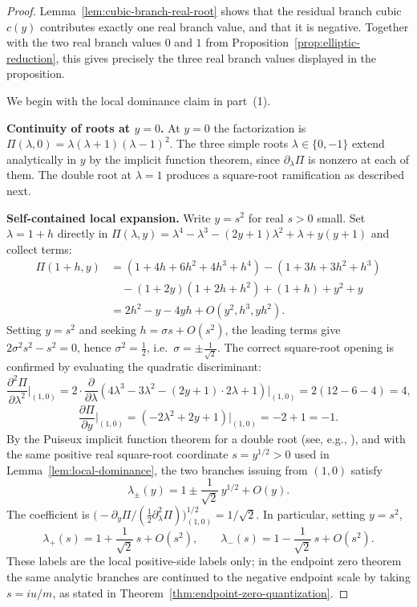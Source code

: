 \begin{proof}
Lemma~\ref{lem:cubic-branch-real-root} shows that the residual branch cubic \(c(y)\) contributes exactly one real branch value, and that it is negative.
Together with the two real branch values \(0\) and \(1\) from Proposition~\ref{prop:elliptic-reduction}, this gives precisely the three real branch values displayed in the proposition.

We begin with the local dominance claim in part~(1).

\medskip
\noindent\textbf{Continuity of roots at $y=0$.}
At $y=0$ the factorization is $\Pi(\lambda,0)=\lambda(\lambda+1)(\lambda-1)^2$.
The three simple roots $\lambda\in\{0,-1\}$ extend analytically in $y$ by the implicit function theorem, since $\partial_\lambda\Pi$ is nonzero at each of them.
The double root at $\lambda=1$ produces a square-root ramification as described next.

\medskip
\noindent\textbf{Self-contained local expansion.}
Write $y=s^2$ for real $s>0$ small.
Set $\lambda=1+h$ directly in $\Pi(\lambda,y)=\lambda^4-\lambda^3-(2y+1)\lambda^2+\lambda+y(y+1)$ and collect terms:
\begin{align*}
\Pi(1+h,y)
&= (1+4h+6h^2+4h^3+h^4) - (1+3h+3h^2+h^3)\\
&\quad - (1+2y)(1+2h+h^2) + (1+h) + y^2+y\\
&= 2h^2 - y - 4yh + O(y^2, h^3, yh^2).
\end{align*}
Setting $y=s^2$ and seeking $h=\sigma s+O(s^2)$, the leading terms give $2\sigma^2 s^2 - s^2 = 0$, hence $\sigma^2=\tfrac12$, i.e.\ $\sigma=\pm\tfrac{1}{\sqrt{2}}$.
The correct square-root opening is confirmed by evaluating the quadratic discriminant:
\[
\frac{\partial^2\Pi}{\partial\lambda^2}\bigg|_{(1,0)} = 2\cdot\frac{\partial}{\partial\lambda}(4\lambda^3-3\lambda^2-(2y+1)\cdot 2\lambda+1)\bigg|_{(1,0)}=2(12-6-4)=4,
\]
\[
\frac{\partial\Pi}{\partial y}\bigg|_{(1,0)} = (-2\lambda^2+2y+1)\bigg|_{(1,0)}=-2+1=-1.
\]
By the Puiseux implicit function theorem for a double root (see, e.g., \cite{BrieskornKnorrer1986}), and with the same positive real square-root coordinate \(s=y^{1/2}>0\) used in Lemma~\ref{lem:local-dominance}, the two branches issuing from $(1,0)$ satisfy
\begin{equation}\label{eq:local-bifurc}
\lambda_\pm(y)=1\pm\frac{1}{\sqrt{2}}\,y^{1/2}+O(y).
\end{equation}
The coefficient is
\(\bigl(-\partial_y\Pi/(\tfrac12\partial_\lambda^2\Pi)\bigr)^{1/2}_{(1,0)}=1/\sqrt2\).
In particular, setting $y=s^2$,
\begin{equation}\label{eq:lambda-pm-local}
\lambda_+(s) = 1 + \frac{1}{\sqrt{2}}\,s + O(s^2),
\qquad
\lambda_-(s) = 1 - \frac{1}{\sqrt{2}}\,s + O(s^2).
\end{equation}
These labels are the local positive-side labels only; in the endpoint zero theorem the same analytic branches are continued to the negative endpoint scale by taking \(s=iu/m\), as stated in Theorem~\ref{thm:endpoint-zero-quantization}.


\end{proof}
